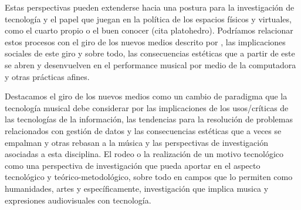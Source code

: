 \color{black}

Estas perspectivas pueden extenderse hacia una postura para la investigación de tecnología y el papel que juegan en la política de los espacios físicos y virtuales, como el cuarto propio \citep{cuartopropio} o el buen conocer (cita platohedro). Podríamos relacionar estos procesos con el giro de los nuevos medios descrito por \cite{manovichlanguage}, las implicaciones sociales de este giro y sobre todo, las consecuencias estéticas que a partir de este se abren y desenvuelven en el performance musical por medio de la computadora y otras prácticas afines. 

Destacamos el giro de los nuevos medios como un cambio de paradigma que la tecnología musical debe considerar por las implicaciones de los usos/críticas de las tecnologías de la información, las tendencias para la resolución de problemas relacionados con gestión de datos y las consecuencias estéticas que a veces se empalman y otras rebasan a la música y las perspectivas de investigación asociadas a esta disciplina. El rodeo o la realización de un motivo tecnológico como una perspectiva de investigación que pueda aportar en el aspecto tecnológico y teórico-metodológico, sobre todo en campos que lo permiten como humanidades, artes y específicamente, investigación que implica musica y expresiones audiovisuales con tecnología.
